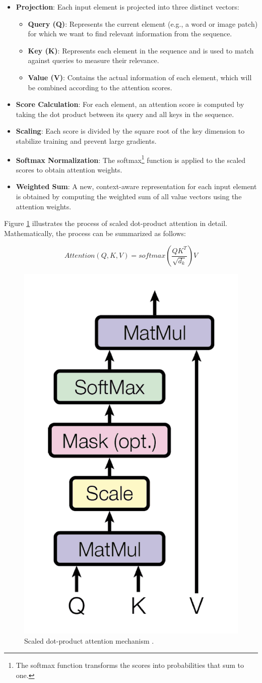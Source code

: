 \documentclass[a4paper,10pt]{book}
\begin{document}
\begin{itemize}
    \item \textbf{Projection}: Each input element is projected into three distinct vectors:
        \begin{itemize}
        \item \textbf{Query (Q)}: Represents the current element (e.g., a word or image patch) for which we want to find relevant information from the sequence.
        \item \textbf{Key (K)}: Represents each element in the sequence and is used to match against queries to measure their relevance.
        \item \textbf{Value (V)}: Contains the actual information of each element, which will be combined according to the attention scores.
        \end{itemize}
    \item \textbf{Score Calculation}: For each element, an attention score is computed by taking the dot product between its query and all keys in the sequence.
    \item \textbf{Scaling}: Each score is divided by the square root of the key dimension to stabilize training and prevent large gradients.
    \item \textbf{Softmax Normalization}: The softmax\footnote{The softmax function transforms the scores into probabilities that sum to one.} function is applied to the scaled scores to obtain attention weights.
    \item \textbf{Weighted Sum}: A new, context-aware representation for each input element is obtained by computing the weighted sum of all value vectors using the attention weights.
\end{itemize}

Figure \ref{fig:scaled_dot_product_attn} illustrates the process of scaled dot-product attention in detail. Mathematically, the process can be summarized as follows:

$$Attention(Q,K,V) = softmax\left(\frac{QK^T}{\sqrt{d_k}}\right)V$$

\begin{figure}[h!]
    \centering
    \includegraphics[width=0.3\linewidth]{reports//assets/scaled_dot_product.png}
    \caption[Scaled dot-product attention]{Scaled dot-product attention mechanism \cite{vaswani_attention_2017}.}
    \label{fig:scaled_dot_product_attn}
\end{figure}
\end{document}
